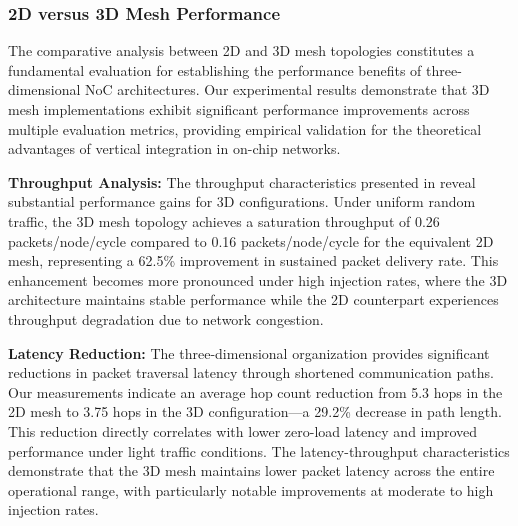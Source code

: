 \documentclass[11pt]{article}
\begin{document}
\subsubsection{2D versus 3D Mesh Performance}

The comparative analysis between 2D and 3D mesh topologies constitutes a fundamental evaluation for establishing the performance benefits of three-dimensional NoC architectures. Our experimental results demonstrate that 3D mesh implementations exhibit significant performance improvements across multiple evaluation metrics, providing empirical validation for the theoretical advantages of vertical integration in on-chip networks.

\textbf{Throughput Analysis:} The throughput characteristics presented in  reveal substantial performance gains for 3D configurations. Under uniform random traffic, the 3D mesh topology achieves a saturation throughput of 0.26 packets/node/cycle compared to 0.16 packets/node/cycle for the equivalent 2D mesh, representing a 62.5\% improvement in sustained packet delivery rate. This enhancement becomes more pronounced under high injection rates, where the 3D architecture maintains stable performance while the 2D counterpart experiences throughput degradation due to network congestion.

\textbf{Latency Reduction:} The three-dimensional organization provides significant reductions in packet traversal latency through shortened communication paths. Our measurements indicate an average hop count reduction from 5.3 hops in the 2D mesh to 3.75 hops in the 3D configuration—a 29.2\% decrease in path length. This reduction directly correlates with lower zero-load latency and improved performance under light traffic conditions. The latency-throughput characteristics demonstrate that the 3D mesh maintains lower packet latency across the entire operational range, with particularly notable improvements at moderate to high injection rates.
\end{document}
